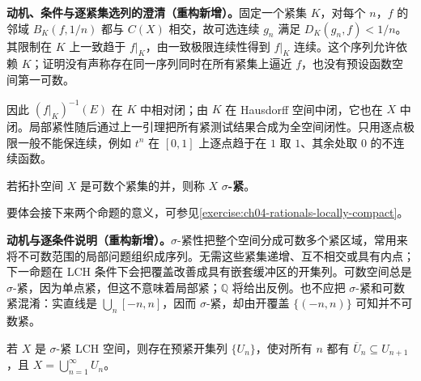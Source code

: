 \documentclass[../../main.tex]{subfiles}%
\begin{document}
\begin{remark}
\textbf{动机、条件与逐紧集选列的澄清（重构新增）。}固定一个紧集 $K$，对每个 $n$，$f$ 的邻域 $B_K(f,1/n)$ 都与 $C(X)$ 相交，故可选连续 $g_n$ 满足 $D_K(g_n,f)<1/n$。其限制在 $K$ 上一致趋于 $f|_K$，由一致极限连续性得到 $f|_K$ 连续。这个序列允许依赖 $K$；证明没有声称存在同一序列同时在所有紧集上逼近 $f$，也没有预设函数空间第一可数。

因此 $(f|_K)^{-1}(E)$ 在 $K$ 中相对闭；由 $K$ 在 Hausdorff 空间中闭，它也在 $X$ 中闭。局部紧性随后通过上一引理把所有紧测试结果合成为全空间闭性。只用逐点极限一般不能保连续，例如 $t^n$ 在 $[0,1]$ 上逐点趋于在 $1$ 取 $1$、其余处取 $0$ 的不连续函数。
\end{remark}
\begin{definition}\label{definition:ch04-sigma-compact}
若拓扑空间 $X$ 是可数个紧集的并，则称 $X$ \textbf{$\sigma$-紧}。
\end{definition}
要体会接下来两个命题的意义，可参见\cref{exercise:ch04-rationals-locally-compact}。
\begin{remark}
\textbf{动机与逐条件说明（重构新增）。}$\sigma$-紧性把整个空间分成可数多个紧区域，常用来将不可数范围的局部问题组织成序列。无需这些紧集递增、互不相交或具有内点；下一命题在 LCH 条件下会把覆盖改善成具有嵌套缓冲区的开集列。可数空间总是 $\sigma$-紧，因为单点紧，但这不意味着局部紧；$\mathbb Q$ 将给出反例。也不应把 $\sigma$-紧和可数紧混淆：实直线是 $\bigcup_n[-n,n]$，因而 $\sigma$-紧，却由开覆盖 $\{(-n,n)\}$ 可知并不可数紧。
\end{remark}
\begin{proposition}\label{proposition:ch04-precompact-exhaustion}
若 $X$ 是 $\sigma$-紧 LCH 空间，则存在预紧开集列 $\{U_n\}$，使对所有 $n$ 都有 $\overline U_n\subseteq U_{n+1}$，且 $X=\bigcup_{n=1}^{\infty}U_n$。
\end{proposition}
\end{document}
